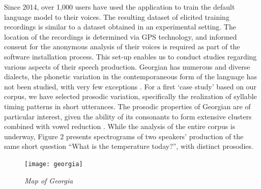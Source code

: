 \documentclass[12pt]{amsart}
\begin{document}
Since 2014, over 1,000 users have used the application to train the default
language model to their voices. The resulting dataset of elicited
training recordings is similar to a dataset obtained in an experimental setting.
The location of the recordings is determined via GPS technology, and informed
consent for the anonymous analysis of their voices is required as part of the
software installation process. This set-up enables us to conduct
studies regarding various aspects of their speech production. Georgian has numerous
 and diverse dialects, the phonetic variation in
the contemporaneous form of the language has not been studied, with very few
exceptions \cite{Ch, CGB}. For a first `case study' based on our corpus, we
have selected prosodic variation, specifically the realization of syllable timing
patterns in short utterances. The prosodic properties of Georgian are of
particular interest, given the ability of its consonants to form extensive
clusters \cite{Ch} combined with vowel reduction \cite{Bu}.
While the analysis of the entire corpus is underway, Figure 2 presents
spectrograms of two speakers' production of the same short question ``What is
the temperature today?'', with distinct prosodies.


\newpage

\begin{figure}
    \centering
        \texttt{[image: georgia]}
    \caption{\footnotesize{\textit{\textsc{} Map of Georgia}}}\label{fig:georgia}
\end{figure}
\end{document}
